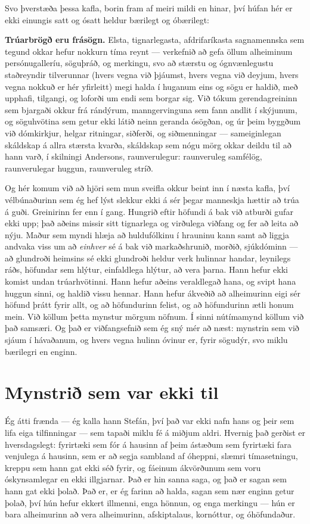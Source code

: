 Svo þverstæða þessa kafla, borin fram af meiri mildi en hinar, því húfan hér er ekki einungis satt og ósatt heldur bærilegt og óbærilegt:

\textbf{Trúarbrögð eru frásögn.} Elsta, tignarlegasta, afdrifaríkasta sagnamennska sem tegund okkar hefur nokkurn tíma reynt — verkefnið að gefa öllum alheiminum persónugalleríu, söguþráð, og merkingu, svo að stærstu og ógnvænlegustu staðreyndir tilverunnar (hvers vegna við þjáumst, hvers vegna við deyjum, hvers vegna nokkuð er hér yfirleitt) megi halda í huganum eins og sögu er haldið, með upphafi, tilgangi, og loforði um endi sem borgar sig. Við tókum gerendagreininn sem bjargaði okkur frá rándýrum, manngervinguna sem fann andlit í skýjunum, og söguhvötina sem getur ekki látið neinn geranda ósögðan, og úr þeim byggðum við dómkirkjur, helgar ritningar, siðferði, og siðmenningar — sameiginlegan skáldskap á allra stærsta kvarða, skáldskap sem nógu mörg okkar deildu til að hann varð, í skilningi Andersons, raunverulegur: raunveruleg samfélög, raunverulegar huggun, raunveruleg stríð.

Og hér komum við að hjöri sem mun sveifla okkur beint inn í næsta kafla, því vélbúnaðurinn sem ég hef lýst slekkur ekki á sér þegar manneskja hættir að trúa á guði. Greinirinn fer enn í gang. Hungrið eftir höfundi á bak við atburði gufar ekki upp; það aðeins missir sitt tignarlega og virðulega viðfang og fer að leita að nýju. Maður sem myndi hlæja að huldufólkinu í hrauninu kann samt að liggja andvaka viss um að \emph{einhver} sé á bak við markaðshrunið, morðið, sjúkdóminn — að glundroði heimsins sé ekki glundroði heldur verk hulinnar handar, leynilegs ráðs, höfundar sem hlýtur, einfaldlega hlýtur, að vera þarna. Hann hefur ekki komist undan trúarhvötinni. Hann hefur aðeins veraldlegað hana, og svipt hana huggun sinni, og haldið vissu hennar. Hann hefur ákveðið að alheimurinn eigi sér höfund þrátt fyrir allt, og að höfundurinn felist, og að höfundurinn ætli honum mein. Við köllum þetta mynstur mörgum nöfnum. Í sinni nútímamynd köllum við það samsæri. Og það er viðfangsefnið sem ég sný mér að næst: mynstrin sem við sjáum í hávaðanum, og hvers vegna hulinn óvinur er, fyrir sögudýr, svo miklu bærilegri en enginn.

\chapter{Mynstrið sem var ekki til}

Ég átti frænda — ég kalla hann Stefán, því það var ekki nafn hans og þeir sem lifa eiga tilfinningar — sem tapaði miklu fé á miðjum aldri. Hvernig það gerðist er hversdagslegt: fyrirtæki sem fór á hausinn af þeim ástæðum sem fyrirtæki fara venjulega á hausinn, sem er að segja sambland af óheppni, slæmri tímasetningu, kreppu sem hann gat ekki séð fyrir, og fáeinum ákvörðunum sem voru óskynsamlegar en ekki illgjarnar. Það er hin sanna saga, og það er sagan sem hann gat ekki þolað. Það er, er ég farinn að halda, sagan sem nær enginn getur þolað, því hún hefur ekkert illmenni, enga hönnun, og enga merkingu — hún er bara alheimurinn að vera alheimurinn, afskiptalaus, kornóttur, og óhöfundaður.

